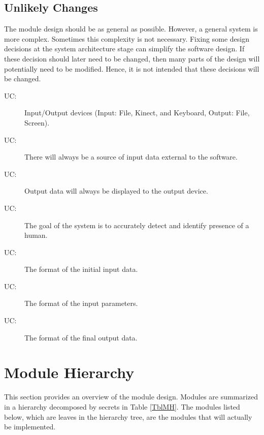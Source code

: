 \documentclass[12pt, titlepage]{article}
\newcounter{ucnum}
\newcommand{\uctheucnum}{UC\theucnum}
\begin{document}

\subsection{Unlikely Changes} \label{SecUchange}

The module design should be as general as possible. However, a general system is
more complex. Sometimes this complexity is not necessary. Fixing some design
decisions at the system architecture stage can simplify the software design. If
these decision should later need to be changed, then many parts of the design
will potentially need to be modified. Hence, it is not intended that these
decisions will be changed.

\begin{description}
\item[ \uctheucnum \label{ucIO}:] Input/Output devices
  (Input: File, Kinect, and Keyboard, Output: File, Screen).
\item[ \uctheucnum \label{ucInput}:] There will always
  be a source of input data external to the software.
\item[ \uctheucnum \label{ucOutput}:] Output data will
  always be displayed to the output device.
\item[ \uctheucnum \label{ucGoal}:] The goal of the system
  is to accurately detect and identify presence of a human.
\item[ \uctheucnum \label{ucFormatIn}:] The format of the 
  initial input data.
\item[ \uctheucnum \label{ucFormatParam}:] The format of the 
  input parameters.
\item[ \uctheucnum \label{ucFormatOut}:] The format of the
  final output data.
\end{description}

\section{Module Hierarchy} \label{SecMH}

This section provides an overview of the module design. Modules are summarized
in a hierarchy decomposed by secrets in Table \ref{TblMH}. The modules listed
below, which are leaves in the hierarchy tree, are the modules that will
actually be implemented.
\end{document}

